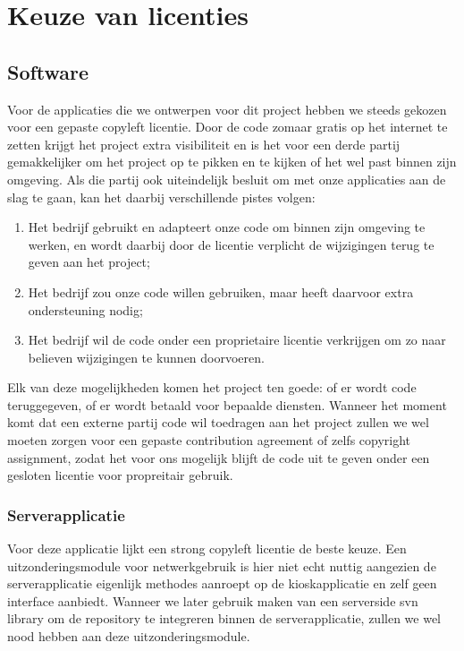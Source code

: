 \section{Keuze van licenties}

\subsection{Software}

Voor de applicaties die we ontwerpen voor dit project hebben we steeds gekozen voor een gepaste copyleft licentie. Door de code zomaar gratis op het internet te zetten krijgt het project extra visibiliteit en is het voor een derde partij gemakkelijker om het project op te pikken en te kijken of het wel past binnen zijn omgeving. Als die partij ook uiteindelijk besluit om met onze applicaties aan de slag te gaan, kan het daarbij verschillende pistes volgen:
\begin{enumerate}
  \item Het bedrijf gebruikt en adapteert onze code om binnen zijn omgeving te werken, en wordt daarbij door de licentie verplicht de wijzigingen terug te geven aan het project;
  \item Het bedrijf zou onze code willen gebruiken, maar heeft daarvoor extra ondersteuning nodig;
  \item Het bedrijf wil de code onder een proprietaire licentie verkrijgen om zo naar believen wijzigingen te kunnen doorvoeren.
\end{enumerate}
Elk van deze mogelijkheden komen het project ten goede: of er wordt code teruggegeven, of er wordt betaald voor bepaalde diensten. Wanneer het moment komt dat een externe partij code wil toedragen aan het project zullen we wel moeten zorgen voor een gepaste contribution agreement of zelfs copyright assignment, zodat het voor ons mogelijk blijft de code uit te geven onder een gesloten licentie voor propreitair gebruik.

\subsubsection{Serverapplicatie}

Voor deze applicatie lijkt een strong copyleft licentie de beste keuze. Een uitzonderingsmodule voor netwerkgebruik is hier niet echt nuttig aangezien de serverapplicatie eigenlijk methodes aanroept op de kioskapplicatie en zelf geen interface aanbiedt. Wanneer we later gebruik maken van een serverside \ac{svn} library om de repository te integreren binnen de serverapplicatie, zullen we wel nood hebben aan deze uitzonderingsmodule.

